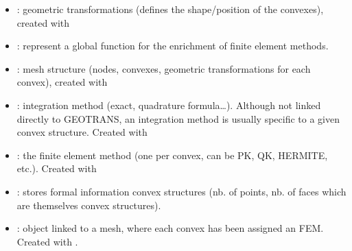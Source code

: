 \documentclass[a4paper,11pt,english]{sphinxmanual}
\begin{document}
\begin{itemize}
\item {} 
: geometric transformations (defines the shape/position of
the convexes), created with 

\item {} 
: represent a global function for the enrichment of finite element methods.

\item {} 
 : mesh structure (nodes, convexes, geometric transformations for
each convex), created with 

\item {} 
 : integration method (exact, quadrature formula…).  Although
not linked directly to GEOTRANS, an integration method is usually specific to a
given convex structure. Created with 

\item {} 
 : the finite element method (one per convex, can be PK, QK,
HERMITE, etc.). Created with 

\item {} 
 : stores formal information convex structures (nb. of points,
nb. of faces which are themselves convex structures).

\item {} 
 : object linked to a mesh, where each convex has been assigned
an FEM. Created with .


\end{itemize}
\end{document}
